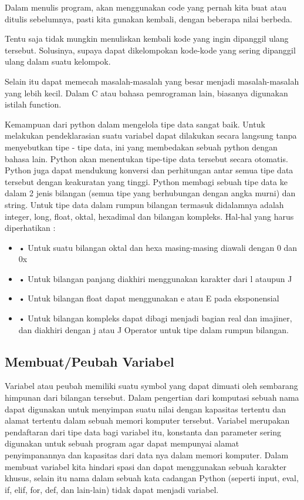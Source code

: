 Dalam menulis program, akan menggunakan code yang pernah kita  buat atau ditulis sebelumnya, pasti
kita gunakan kembali, dengan beberapa nilai berbeda.
 
Tentu saja tidak mungkin menuliskan kembali kode yang ingin dipanggil ulang tersebut.
Solusinya, supaya dapat dikelompokan kode-kode yang sering dipanggil ulang dalam suatu kelompok.

Selain itu dapat memecah masalah-masalah yang besar  menjadi masalah-masalah yang lebih kecil.
Dalam C atau bahasa pemrograman lain, biasanya digunakan istilah function.

Kemampuan dari python dalam mengelola tipe data sangat baik. Untuk melakukan pendeklarasian suatu variabel dapat dilakukan secara langsung tanpa menyebutkan tipe - tipe data, ini yang membedakan sebuah python dengan bahasa lain. Python akan menentukan tipe-tipe data tersebut secara otomatis. Python juga dapat mendukung konversi dan perhitungan antar semua tipe data tersebut dengan keakuratan yang tinggi. Python membagi sebuah tipe data ke dalam 2 jenis bilangan (semua tipe yang berhubungan dengan angka murni) dan string. Untuk tipe data dalam rumpun bilangan termasuk didalamnya adalah integer, long, float, oktal, hexadimal dan bilangan kompleks. Hal-hal yang harus diperhatikan :
\begin{itemize}
\item
•    Untuk suatu bilangan oktal dan hexa masing-masing diawali dengan 0 dan 0x
\item
•    Untuk bilangan panjang diakhiri menggunakan karakter dari l ataupun J
\item
•    Untuk bilangan float dapat menggunakan e atau E pada eksponensial
\item
•    Untuk bilangan kompleks dapat dibagi menjadi bagian real dan imajiner, dan diakhiri dengan j atau J Operator untuk tipe dalam rumpun bilangan.\cite{utamipemrograman}
\end{itemize}

\subsection{Membuat/Peubah Variabel}
Variabel atau peubah memiliki suatu symbol yang dapat dimuati oleh sembarang himpunan dari bilangan tersebut. Dalam pengertian dari komputasi sebuah nama dapat digunakan untuk menyimpan suatu nilai dengan kapasitas tertentu dan alamat tertentu dalam sebuah memori komputer tersebut. Variabel merupakan pendaftaran dari tipe data bagi variabel itu, konstanta dan parameter sering digunakan untuk sebuah program agar dapat mempunyai alamat penyimpanannya dan kapasitas dari data nya dalam memori komputer. Dalam membuat variabel kita hindari spasi dan dapat menggunakan sebuah karakter khusus, selain itu nama dalam sebuah kata cadangan Python (seperti input, eval, if, elif, for, def, dan lain-lain) tidak dapat menjadi variabel.\cite{irfani2016bahan}

